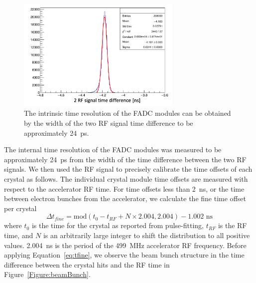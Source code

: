 \begin{figure}[htb]
  \centering
      \includegraphics[width=0.7\textwidth]{pics/performance/rfRes.png}
  \caption[FADC intrinsic time resolution]{The intrinsic time resolution of the FADC modules can be obtained by the width of the two RF signal time difference to be approximately 24~ps.}
  \label{Figure:intrTres}
\end{figure}

The internal time resolution of the FADC modules was measured to be approximately 24~ps from the width of the time difference between the two RF signals. We then used the RF signal to precisely calibrate the time offsets of each crystal as follows. The individual crystal module time offsets are measured with respect to the accelerator RF time. For time offsets less than 2~ns, or the time between electron bunches from the accelerator, we calculate the fine time offset per crystal \\

\begin{equation}
	\label{eq:tfine}
	\Delta t_{fine} = \textrm{mod}(t_0 - t_{RF} + N\times 2.004, 2.004) - 1.002 \textrm{ ns}
\end{equation}
where $t_0$ is the time for the crystal as reported from pulse-fitting, $t_{RF}$ is the RF time, and $N$ is an arbitrarily large integer to shift the distribution to all positive values. 2.004~ns is the period of the 499~MHz accelerator RF frequency. Before applying Equation~\eqref{eq:tfine}, we observe the beam bunch structure in the time difference between the crystal hits and the RF time in Figure~\ref{Figure:beamBunch}. 

